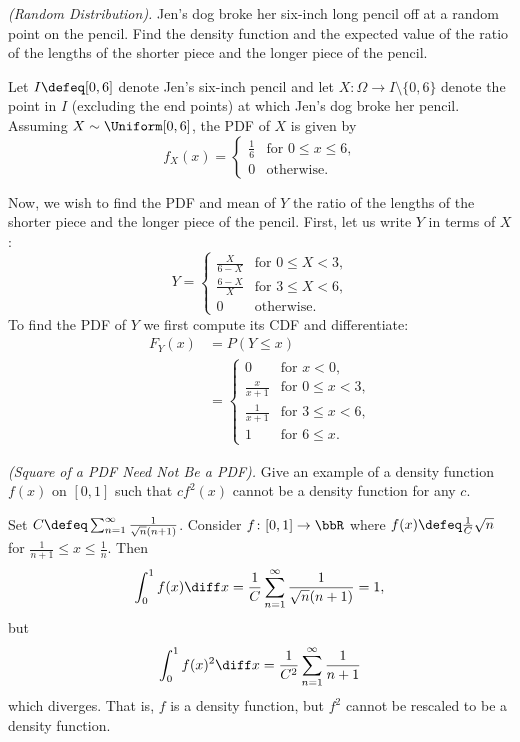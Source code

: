 \begin{problem}[Handout 12, \# 19]
  \emph{(Random Distribution).} Jen's dog broke her six-inch long pencil
  off at a random point on the pencil. Find the density function and the
  expected value of the ratio of the lengths of the shorter piece and the
  longer piece of the pencil.
\end{problem}
\begin{solution}
  Let \(I\defeq[0,6]\) denote Jen's six-inch pencil and let
  \(X\colon\Omega\to I\setminus\{0,6\}\) denote the point in \(I\)
  (excluding the end points) at which Jen's dog broke her pencil. Assuming
  \(X\sim\Uniform[0,6]\), the PDF of \(X\) is given by
  \[
    f_X(x)=
    \begin{cases}
      \frac{1}{6}&\text{for \(0\leq x\leq 6\),}\\
      0&\text{otherwise.}
    \end{cases}
  \]

  Now, we wish to find the PDF and mean of \(Y\) the ratio of the lengths
  of the shorter piece and the longer piece of the pencil. First, let us
  write \(Y\) in terms of \(X\):
  \[
    Y=
    \begin{cases}
      \frac{X}{6-X}&\text{for \(0\leq X<3\),}\\
      \frac{6-X}{X}&\text{for \(3\leq X<6\),}\\
      0&\text{otherwise.}
    \end{cases}
  \]
  To find the PDF of \(Y\) we first compute its CDF and differentiate:
  \begin{align*}
    F_Y(x)
    &=P(Y\leq x)\\
    &=\begin{cases}
      0&\text{for \(x<0\),}\\
      \frac{x}{x+1}&\text{for \(0\leq x<3\),}\\
      \frac{1}{x+1}&\text{for \(3\leq x<6\),}\\
      1&\text{for \(6\leq x\).}
      \end{cases}
  \end{align*}
\end{solution}
\newpage

\begin{problem}[Handout 12, \# 20]
  \emph{(Square of a PDF Need Not Be a PDF).} Give an example of a density
  function \(f(x)\) on \([0,1]\) such that \(cf^2(x)\) cannot be a density
  function for any \(c\).
\end{problem}
\begin{solution}
  Set $C \defeq\sum_{n=1}^\infty \frac{1}{\sqrt{n}(n+1)}$. Consider
  $f\colon [0,1] \to \bbR$ where $f(x)\defeq\frac{1}{C}\sqrt{n}$ for
  $\frac{1}{n+1}\leq x\leq \frac{1}{n}$. Then
  \[
    \int_0^1 f(x) \diff x = \frac{1}{C} \sum_{n=1}^\infty
    \frac{1}{\sqrt{n}(n+1)} =1,
  \]
  but
  \[
    \int_0^1 f(x)^2 \diff x = \frac{1}{C^2} \sum_{n=1}^\infty \frac{1}{n+1}
  \]
  which diverges. That is, $f$ is a density function, but $f^2$ cannot be
  rescaled to be a density function.
\end{solution}
\newpage

